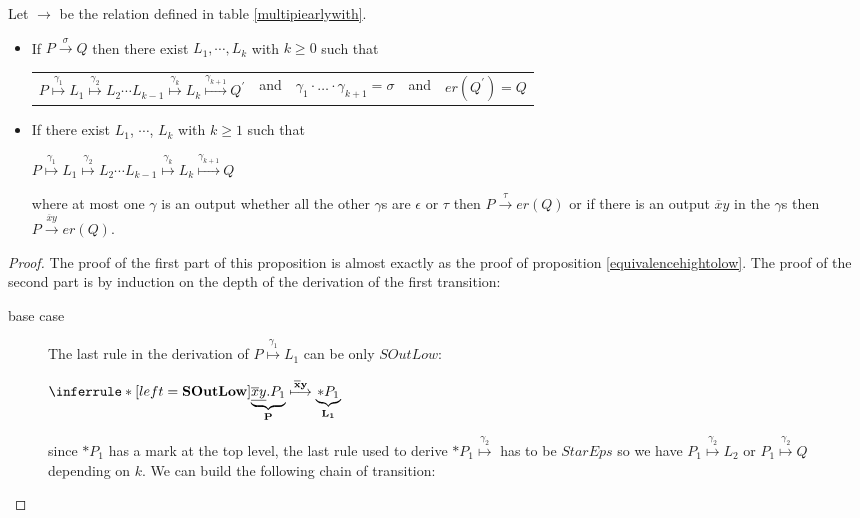 \begin{proposition}
  Let $\rightarrow$ be the relation defined in table \ref{multipiearlywith}.
  \begin{itemize}
    \item
      If $P\xrightarrow{\sigma} Q$ then there exist $L_{1}, \cdots, L_{k}$ with $k\geq 0$ such that 
      \begin{center}
	\begin{tabular}{lllll}
	  $P 
	    \stackrel{\gamma_{1}}{\longmapsto} 
	      L_{1}  
		\stackrel{\gamma_{2}}{\longmapsto} 
		  L_{2} 
		    \cdots 
		      L_{k-1} 
			\stackrel{\gamma_{k}}{\longmapsto} 
			  L_{k} 
			    \stackrel{\gamma_{k+1}}{\longmapsto} 
			      Q^{'}$ 
	&
	  and
	&
	  $\gamma_{1} \cdot \ldots \cdot \gamma_{k+1} =  \sigma$  
	&
	  and
	&
	  $er(Q^{'})=Q$
	\end{tabular}
      \end{center}
    \item 
      If there exist $L_{1}$, $\cdots$, $L_{k}$ with $k\geq 1$ such that
      \begin{center}
	  $P 
	    \stackrel{\gamma_{1}}{\longmapsto} 
	      L_{1}  
		\stackrel{\gamma_{2}}{\longmapsto} 
		  L_{2} 
		    \cdots 
		      L_{k-1} 
			\stackrel{\gamma_{k}}{\longmapsto} 
			  L_{k} 
			    \stackrel{\gamma_{k+1}}{\longmapsto} 
			      Q$ 
      \end{center}
      where at most one $\gamma$ is an output whether all the other $\gamma$s are $\epsilon$ or $\tau$ then $P\xrightarrow{\tau} er(Q)$ or if there is an output $\overline{x}y$ in the $\gamma$s then $P\xrightarrow{\overline{x}y} er(Q)$. 
  \end{itemize}
  \begin{proof}
    The proof of the first part of this proposition is almost exactly as the proof of proposition \ref{equivalencehightolow}. The proof of the second part is by induction on the depth of the derivation of the first transition:
    \begin{description}
      \item[base case]
 	The last rule in the derivation of $P \stackrel{\gamma_{1}}{\longmapsto} L_{1}$ can be only $SOutLow$:
	    \begin{center}
 		  $\inferrule* [left=\bf{SOutLow}]{
 		    }{
 		      \underbrace{\underline{\overline{x}y}.P_{1}}_{P} \stackrel{\overline{x}y}{\longmapsto} \underbrace{* P_{1}}_{L_{1}}
 		  }$ 
	    \end{center}
	    since $*P_{1}$ has a mark at the top level, the last rule used to derive $*P_{1}\stackrel{\gamma_{2}}{\longmapsto}$ has to be $StarEps$ so we have $P_{1}\stackrel{\gamma_{2}}{\longmapsto}L_{2}$ or $P_{1}\stackrel{\gamma_{2}}{\longmapsto}Q$ depending on $k$. We can build the following chain of transition:

\end{description}
\end{proof}
\end{proposition}
